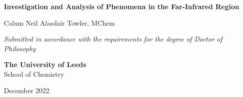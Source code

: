\begin{titlepage}
   \begin{center}
       \vspace*{4cm}

       \huge \textbf{Investigation and Analysis of Phenomena in the Far-Infrared Region}\\
            
       \vspace{2cm}

       \large Calum Neil Alasdair Towler, MChem

       \vspace{4cm}
            
       \small \textit{Submitted in accordance with the requirements for the degree of Doctor of Philosophy}
            
       \vspace{1cm}
            
       \large \textbf{The University of Leeds}\\
       School of Chemistry\\

        \vspace{2cm}
       
       December 2022
            
   \end{center}
\end{titlepage}